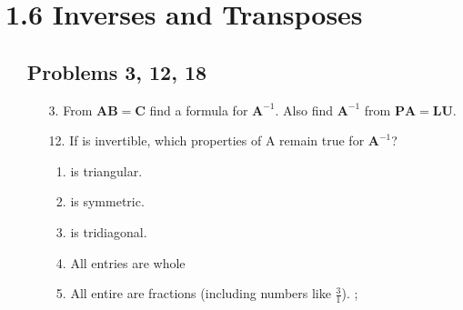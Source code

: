 \section{1.6 Inverses and Transposes}
\begin{itemize}
  \item []

    \subsection{Problems 3, 12, 18}
    \begin{itemize}\color{foreground-2}
      \item[3.] From \(\bm{AB} = \bm{C}\) find a formula for \(\bm{A}^{-1}\). Also
        find \(\bm{A}^{-1}\) from \(\bm{PA} = \bm{LU}\).

      \item[12.] If  is invertible, which properties of A remain true
        for \(\bm{A}^{-1}\)?
        \begin{enumerate}[label=(\alph*)]
          \item {} is triangular. 
          \item {} is symmetric. 
          \item {} is tridiagonal. 
          \item All entries are whole 
          \item All entire are fractions (including numbers like \( \tfrac{3}{1} \)). ;
        \end{enumerate}


\end{itemize}
\end{itemize}
